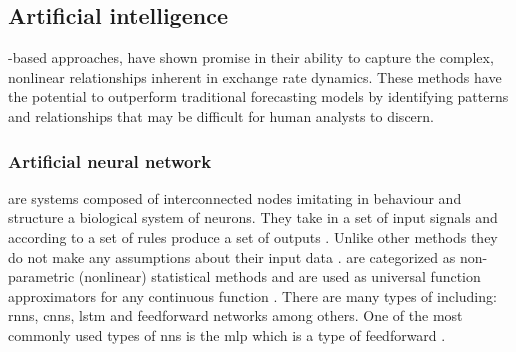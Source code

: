 % 
% 
% 
% 
% 

\subsection{Artificial intelligence}\label{Artificial intelligence}

-based approaches, have shown promise in their ability to capture the complex, nonlinear relationships inherent in exchange rate dynamics. These methods have the potential to outperform traditional forecasting models by identifying patterns and relationships that may be difficult for human analysts to discern.

\subsubsection{Artificial neural network}\label{Artificial neural network}

 are systems composed of interconnected nodes imitating in behaviour and structure a biological system of neurons. They take in a set of input signals and according to a set of rules produce a set of outputs \cite{linear-vs-nn}. Unlike other  methods they do not make any assumptions about their input data \cite{ann-1}.  are categorized as non-parametric (nonlinear) statistical methods and are used as universal function approximators for any continuous function \cite{svm-2}. There are many types of  including: \glspl{rnn}, \glspl{cnn}, \gls{lstm} and feedforward networks among others. One of the most commonly used types of \glspl{nn} is the \gls{mlp} which is a type of feedforward .

